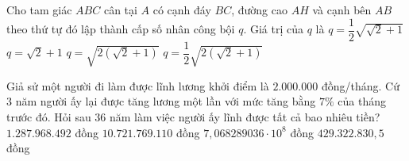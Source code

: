 \begin{ex}%
	Cho tam giác $ ABC $ cân tại $ A $ có cạnh đáy $ BC $,  đường cao $ AH $ và cạnh bên $ AB $ theo thứ tự đó lập thành cấp số nhân công bội $ q $. Giá trị của $ q $ là
	\choice
	{$ q=\dfrac{1}{2}\sqrt{\sqrt{2}+1} $ }
	{$ q=\sqrt{2}+1 $ }
	{$ q=\sqrt{2(\sqrt{2}+1)} $}
	{\True $ q=\dfrac{1}{2}\sqrt{2(\sqrt{2}+1)} $ }
\end{ex}
\begin{ex}%
	Giả sử một người đi làm được lĩnh lương khởi điểm là $2.000.000$ đồng/tháng. Cứ $3$ năm người ấy lại được tăng lương một lần với mức tăng bằng $7\%$ của tháng trước đó. Hỏi sau $36$ năm làm việc người ấy lĩnh được tất cả bao nhiêu tiền?
	\choice
	{\True $ 1.287.968.492 $ đồng}
	{$ 10.721.769.110 $ đồng}
	{$ 7{,}068289036\cdot 10^8 $ đồng}
	{$ 429.322.830{,}5 $ đồng}
\end{ex}

